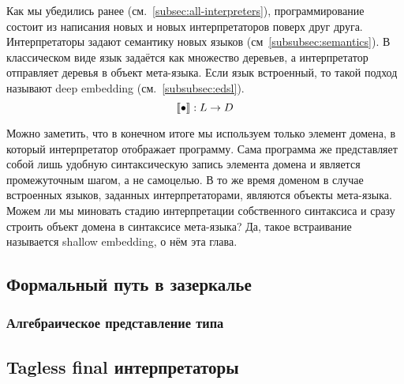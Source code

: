 
Как мы убедились ранее (см.~\ref{subsec:all-interpreters}), программирование состоит из написания новых и новых интерпретаторов поверх друг друга.
Интерпретаторы задают семантику новых языков (см~\ref{subsubsec:semantics}).
В классическом виде язык задаётся как множество деревьев, а интерпретатор отправляет деревья в объект мета-языка.
Если язык встроенный, то такой подход называют deep embedding (см.~\ref{subsubsec:edsl}).
\[
    \llbracket{\bullet}\rrbracket : L \to D
\]

Можно заметить, что в конечном итоге мы используем только элемент домена, в который интерпретатор отображает программу.
Сама программа же представляет собой лишь удобную синтаксическую запись элемента домена и является промежуточным шагом, а не самоцелью.
В то же время доменом в случае встроенных языков, заданных интерпретаторами, являются объекты мета-языка.
Можем ли мы миновать стадию интерпретации собственного синтаксиса и сразу строить объект домена в синтаксисе мета-языка?
Да, такое встраивание называется shallow embedding, о нём эта глава.

\subsection{Формальный путь в зазеркалье}

\subsubsection{Алгебраическое представление типа}



\cite[глава 1]{maguire-types}




\cite{gibbons2013functional, gibbons2014folding}




\subsection{Tagless final интерпретаторы}

